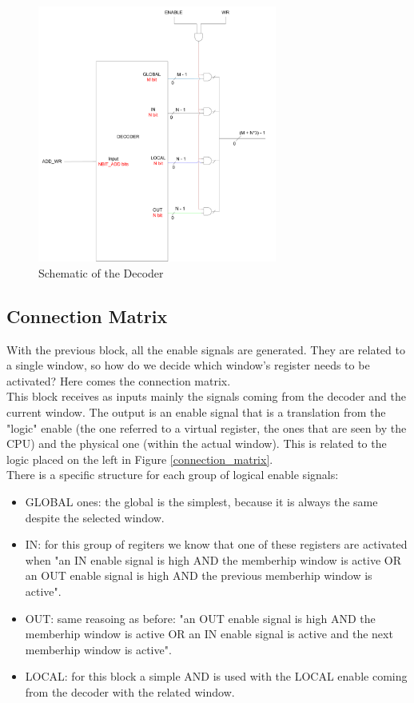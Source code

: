 \begin{figure}[ht]
    \centering
    \includegraphics[width=0.7\textwidth]{chapters/4_DecodeStage/images/Decoder.pdf}
    \caption{Schematic of the Decoder}
    \label{decoder}
\end{figure}

\subsection{Connection Matrix}

With the previous block, all the enable signals are generated. They are related to a single window, so how do we decide which window's register needs to be activated? Here comes the connection matrix.\\ 

This block receives as inputs mainly the signals coming from the decoder and the current window. The output is an enable signal that is a translation from the "logic" enable (the one referred to a virtual register, the ones that are seen by the CPU) and the physical one (within the actual window). This is related to the logic placed on the left in Figure \ref{connection_matrix}.\\

There is a specific structure for each group of logical enable signals:
\begin{itemize}
  \item GLOBAL ones: the global is the simplest, because it is always the same despite the selected window.
  \item IN: for this group of regiters we know that one of these registers are activated when "an IN enable signal is high AND the memberhip window is active OR an OUT enable signal is high AND the previous memberhip window is active".
  \item OUT: same reasoing as before: "an OUT enable signal is high AND the memberhip window is active OR an IN enable signal is active and the next memberhip window is active".
  \item LOCAL: for this block a simple AND is used with the LOCAL enable coming from the decoder with the related window. 
\end{itemize}

